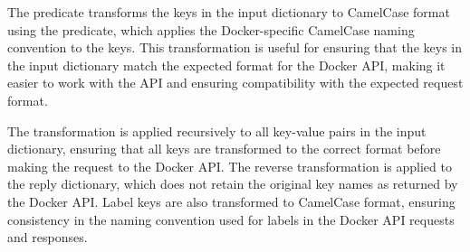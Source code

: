 The  predicate transforms the keys in the input dictionary to
CamelCase format using the  predicate, which applies the
Docker-specific CamelCase naming convention to the keys. This
transformation is useful for ensuring that the keys in the input
dictionary match the expected format for the Docker API, making it
easier to work with the API and ensuring compatibility with the expected
request format.

The transformation is applied recursively to all key-value pairs in the
input dictionary, ensuring that all keys are transformed to the correct
format before making the request to the Docker API. The reverse
transformation is applied to the reply dictionary, which does not retain
the original key names as returned by the Docker API. Label keys are
also transformed to CamelCase format, ensuring consistency in the naming
convention used for labels in the Docker API requests and responses.\vspace{0.7cm}

